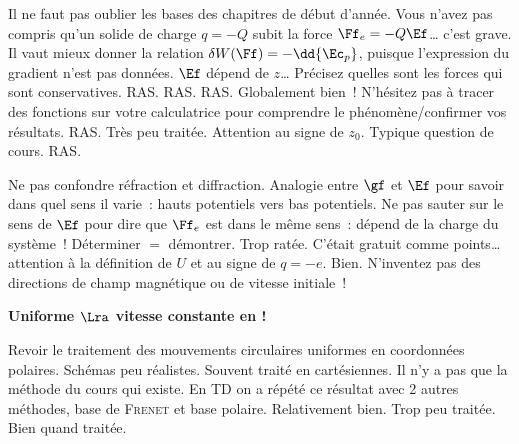 \documentclass[a4paper, 12pt, final, garamond]{book}
\begin{document}
\setcounter{section}{0}
\begin{enumerate}
	Il ne faut pas oublier les bases des chapitres de début d'année.
	Vous n'avez pas compris qu'un solide de charge $q = -Q$ subit la force $\Ff_e
		= -Q\Ef$… c'est grave.
	Il vaut mieux donner la relation $\delta W(\Ff) = -\dd{\Ec_p}$, puisque
	l'expression du gradient n'est pas données.
	$\Ef$ dépend de $z$…
	Précisez quelles sont les forces qui sont conservatives.
	RAS.
	RAS.
	RAS.
	Globalement bien~! N'hésitez pas à tracer des fonctions sur votre calculatrice
	pour comprendre le phénomène/confirmer vos résultats.
	RAS.
	Très peu traitée.
	Attention au signe de $z_0$.
	Typique question de cours.
	RAS.
\end{enumerate}

\begin{enumerate}
	Ne pas confondre réfraction et diffraction.
	Analogie entre $\gf$ et $\Ef$ pour savoir dans quel sens il varie~: hauts
	potentiels vers bas potentiels. Ne pas sauter sur le sens de $\Ef$ pour dire
	que $\Ff_e$ est dans le même sens~: dépend de la charge du système~!
	Déterminer $=$ démontrer.
	Trop ratée. C'était gratuit comme points… attention à la définition de $U$ et
	au signe de $q = -e$.
	Bien.
	N'inventez pas des directions de champ magnétique ou de vitesse initiale~!
	\begin{center}
		\textbf{Uniforme $\Lra$ vitesse constante en  !}
	\end{center}
	Revoir le traitement des mouvements circulaires uniformes en coordonnées
	polaires. Schémas peu réalistes.
	Souvent traité en cartésiennes. Il n'y a pas que la méthode du cours qui
	existe. En TD on a répété ce résultat avec 2 autres méthodes, base de
	\textsc{Frenet} et base polaire.
	Relativement bien.
	Trop peu traitée.
	Bien quand traitée.
\end{enumerate}
\end{document}
